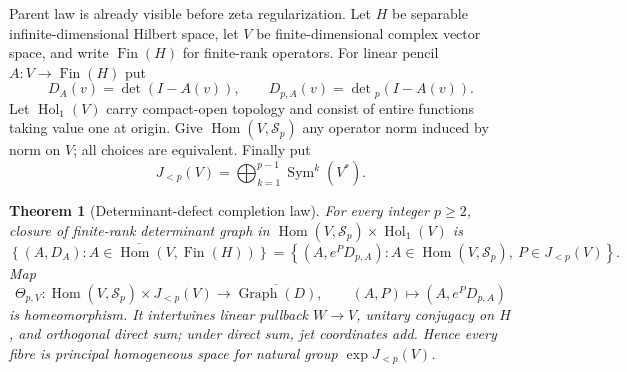 \documentclass[11pt]{article}
\newtheorem{theorem}{Theorem}[section]
\theoremstyle{definition}
\theoremstyle{remark}
\begin{document}
Parent law is already visible before zeta regularization.  Let $H$ be separable
infinite-dimensional Hilbert space, let $V$ be finite-dimensional complex vector space, and
write $\operatorname{Fin}(H)$ for finite-rank operators.  For linear pencil
$A:V\to\operatorname{Fin}(H)$ put
\[
 D_A(v)=\det(I-A(v)),\qquad D_{p,A}(v)=\det{}_p(I-A(v)).
\]
Let $\operatorname{Hol}_1(V)$ carry compact-open topology and consist of entire functions taking
value one at origin.  Give $\operatorname{Hom}(V,\mathcal S_p)$ any operator norm induced by
norm on $V$; all choices are equivalent.  Finally put
\[
 J_{<p}(V)=\bigoplus_{k=1}^{p-1}\operatorname{Sym}^k(V^*).
\]

\begin{theorem}[Determinant-defect completion law]
\label{thm:completion-law}
For every integer $p\geq2$, closure of finite-rank determinant graph in
$\operatorname{Hom}(V,\mathcal S_p)\times\operatorname{Hol}_1(V)$ is
\begin{equation}
 \overline{\left\{(A,D_A):A\in\operatorname{Hom}(V,\operatorname{Fin}(H))\right\}}
 =
 \left\{\left(A,e^P D_{p,A}\right):
 A\in\operatorname{Hom}(V,\mathcal S_p),\ P\in J_{<p}(V)\right\}.       \tag{DC}
\end{equation}
Map
\begin{equation}
\Theta_{p,V}:\operatorname{Hom}(V,\mathcal S_p)\times J_{<p}(V)
 \longrightarrow\overline{\operatorname{Graph}(D)},\qquad
 (A,P)\longmapsto(A,e^P D_{p,A})                                  \tag{1.D}
\end{equation}
is homeomorphism.  It intertwines linear pullback $W\to V$, unitary conjugacy on $H$, and
orthogonal direct sum; under direct sum, jet coordinates add.  Hence every fibre is principal
homogeneous space for natural group $\exp J_{<p}(V)$.
\end{theorem}
\end{document}
